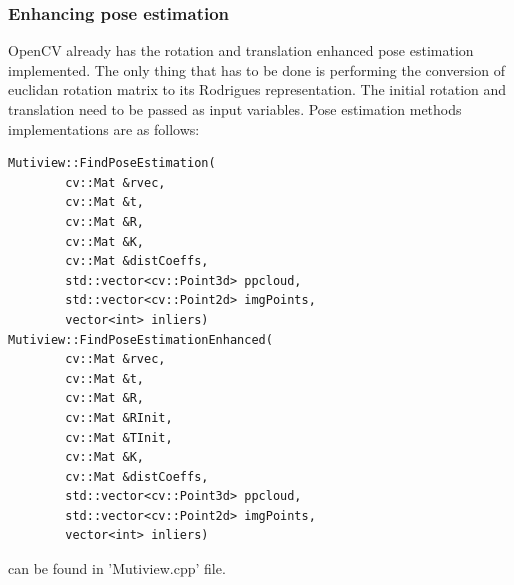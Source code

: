 \subsubsection{Enhancing pose estimation}
OpenCV already has the rotation and translation enhanced pose estimation implemented. The only thing that has to be done is performing the conversion of euclidan rotation matrix to its Rodrigues representation. The initial rotation and translation need to be passed as input variables. Pose estimation methods implementations are as follows: 
\begin{lstlisting}
Mutiview::FindPoseEstimation(
        cv::Mat &rvec,
        cv::Mat &t,
        cv::Mat &R,
        cv::Mat &K,
        cv::Mat &distCoeffs,
        std::vector<cv::Point3d> ppcloud,
        std::vector<cv::Point2d> imgPoints,
        vector<int> inliers) 
Mutiview::FindPoseEstimationEnhanced(
        cv::Mat &rvec,
        cv::Mat &t,
        cv::Mat &R,
        cv::Mat &RInit,
        cv::Mat &TInit,
        cv::Mat &K,
        cv::Mat &distCoeffs,
        std::vector<cv::Point3d> ppcloud,
        std::vector<cv::Point2d> imgPoints,
        vector<int> inliers)
\end{lstlisting}
can be found in 'Mutiview.cpp' file.



